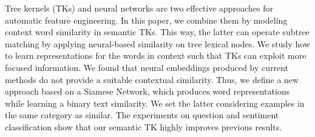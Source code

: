 Tree kernels (TKs) and neural networks are two effective approaches for automatic feature engineering. In this paper, we combine them by modeling context word similarity in semantic TKs. This way, the latter can operate subtree matching by applying neural-based similarity on tree lexical nodes. We study how to learn representations for the words in context such that TKs can exploit more focused information. We found that neural embeddings produced by current methods do not provide a suitable contextual similarity. Thus, we define a new approach based on a Siamese Network, which produces word representations while learning a binary text similarity. We set the latter considering examples in the same category as similar. The experiments on question and sentiment classification show that our semantic TK highly improves previous results.
